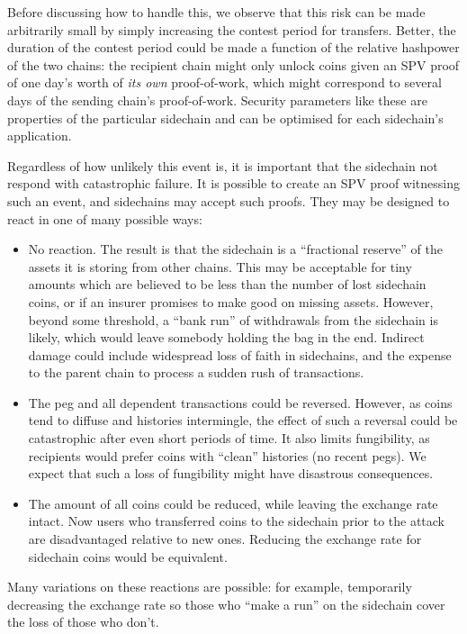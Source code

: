 \documentclass[letterpaper]{article}
\newcommand{\mainchain}{parent chain\xspace}
\newcommand{\sidechain}{sidechain\xspace}
\newcommand{\sidechains}{sidechains\xspace}
\newcommand{\sidecoins}{sidechain coins\xspace}
\begin{document}
Before discussing how to handle this, we observe that this risk can be made
arbitrarily small by simply increasing the contest period for transfers. Better,
the duration of the contest period could be made a function of the relative hashpower
of the two chains: the recipient chain might only unlock coins given an SPV proof
of one day's worth of \emph{its own} proof-of-work, which might correspond to
several days of the sending chain's proof-of-work. Security parameters like these
are properties of the particular sidechain and can be optimised for each sidechain's
application.

Regardless of how unlikely this event is, it is important that the \sidechain
not respond with catastrophic failure. It is possible to create an SPV proof
witnessing such an event, and \sidechains may accept such proofs. They may
be designed to react in one of many possible ways:
\begin{itemize}
\item No reaction. The result is that the \sidechain is a ``fractional reserve''
of the assets it is storing from other chains. This may be acceptable for tiny
amounts which are believed to be less than the number of lost \sidecoins,
or if an insurer promises to make good on missing assets. However,
beyond some threshold, a ``bank run'' of withdrawals from the \sidechain is likely,
which would leave somebody holding the bag in the end. Indirect damage could include
widespread loss of faith in \sidechains, and the expense to the \mainchain to process
a sudden rush of transactions.
\item The peg and all dependent transactions could be
reversed. However, as coins tend to diffuse and histories intermingle, the effect of such a
reversal could be catastrophic after even short periods of time. It also limits fungibility, as
recipients would prefer coins with ``clean'' histories (no recent pegs). We expect that such a loss of fungibility might have disastrous consequences.

\item The amount of all coins could be reduced,
while leaving the exchange rate intact. Now users who transferred coins to the sidechain
prior to the attack are disadvantaged relative to new ones. Reducing the exchange rate for
sidechain coins would be equivalent.
\end{itemize}

Many variations on these reactions are possible: for example, temporarily decreasing the exchange
rate so those who ``make a run'' on the \sidechain cover the loss of those who don't.
\end{document}
